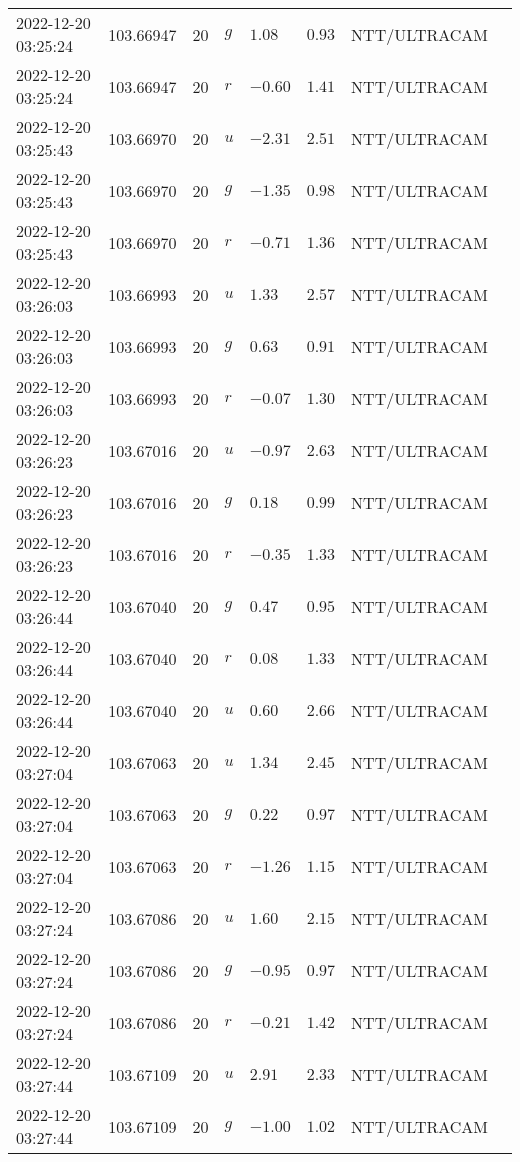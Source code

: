 \documentclass{nature_plusfigure}
\begin{document}
\begin{supplement}
\begin{center}
\begin{longtable}{llllllll}
2022-12-20 03:25:24 & 103.66947 & 20 & $g$ & $1.08$ & $0.93$ & NTT/ULTRACAM &  \\ 
2022-12-20 03:25:24 & 103.66947 & 20 & $r$ & $-0.60$ & $1.41$ & NTT/ULTRACAM &  \\ 
2022-12-20 03:25:43 & 103.66970 & 20 & $u$ & $-2.31$ & $2.51$ & NTT/ULTRACAM &  \\ 
2022-12-20 03:25:43 & 103.66970 & 20 & $g$ & $-1.35$ & $0.98$ & NTT/ULTRACAM &  \\ 
2022-12-20 03:25:43 & 103.66970 & 20 & $r$ & $-0.71$ & $1.36$ & NTT/ULTRACAM &  \\ 
2022-12-20 03:26:03 & 103.66993 & 20 & $u$ & $1.33$ & $2.57$ & NTT/ULTRACAM &  \\ 
2022-12-20 03:26:03 & 103.66993 & 20 & $g$ & $0.63$ & $0.91$ & NTT/ULTRACAM &  \\ 
2022-12-20 03:26:03 & 103.66993 & 20 & $r$ & $-0.07$ & $1.30$ & NTT/ULTRACAM &  \\ 
2022-12-20 03:26:23 & 103.67016 & 20 & $u$ & $-0.97$ & $2.63$ & NTT/ULTRACAM &  \\ 
2022-12-20 03:26:23 & 103.67016 & 20 & $g$ & $0.18$ & $0.99$ & NTT/ULTRACAM &  \\ 
2022-12-20 03:26:23 & 103.67016 & 20 & $r$ & $-0.35$ & $1.33$ & NTT/ULTRACAM &  \\ 
2022-12-20 03:26:44 & 103.67040 & 20 & $g$ & $0.47$ & $0.95$ & NTT/ULTRACAM &  \\ 
2022-12-20 03:26:44 & 103.67040 & 20 & $r$ & $0.08$ & $1.33$ & NTT/ULTRACAM &  \\ 
2022-12-20 03:26:44 & 103.67040 & 20 & $u$ & $0.60$ & $2.66$ & NTT/ULTRACAM &  \\ 
2022-12-20 03:27:04 & 103.67063 & 20 & $u$ & $1.34$ & $2.45$ & NTT/ULTRACAM &  \\ 
2022-12-20 03:27:04 & 103.67063 & 20 & $g$ & $0.22$ & $0.97$ & NTT/ULTRACAM &  \\ 
2022-12-20 03:27:04 & 103.67063 & 20 & $r$ & $-1.26$ & $1.15$ & NTT/ULTRACAM &  \\ 
2022-12-20 03:27:24 & 103.67086 & 20 & $u$ & $1.60$ & $2.15$ & NTT/ULTRACAM &  \\ 
2022-12-20 03:27:24 & 103.67086 & 20 & $g$ & $-0.95$ & $0.97$ & NTT/ULTRACAM &  \\ 
2022-12-20 03:27:24 & 103.67086 & 20 & $r$ & $-0.21$ & $1.42$ & NTT/ULTRACAM &  \\ 
2022-12-20 03:27:44 & 103.67109 & 20 & $u$ & $2.91$ & $2.33$ & NTT/ULTRACAM &  \\ 
2022-12-20 03:27:44 & 103.67109 & 20 & $g$ & $-1.00$ & $1.02$ & NTT/ULTRACAM &  \\ 

\end{longtable}
\end{center}
\end{supplement}
\end{document}
